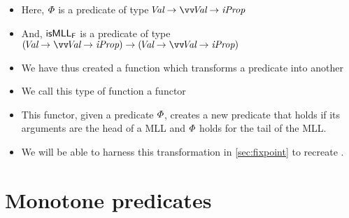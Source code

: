 \documentclass[thesis.tex]{subfiles}
\begin{document}
\begin{itemize}
    \item Here, $\varPhi$ is a predicate of type $\Val \to \vect{\Val} \to \iProp$
    \item And, $\textsf{\upshape isMLL}_{\textsf{\upshape F}}$ is a predicate of type $(\Val \to \vect{\Val} \to \iProp) \to (\Val \to \vect{\Val} \to \iProp)$
    \item We have thus created a  function which transforms a predicate into another
    \item We call this type of function a functor 
    \item This functor, given a predicate $\varPhi$, creates a new predicate that holds if its arguments are the head of a MLL and $\varPhi$ holds for the tail of the MLL.
    \item We will be able to harness this transformation in \cref*{sec:fixpoint} to recreate \isMLL.
\end{itemize}

\section{Monotone predicates}
\label{sec:monotone}
\end{document}
